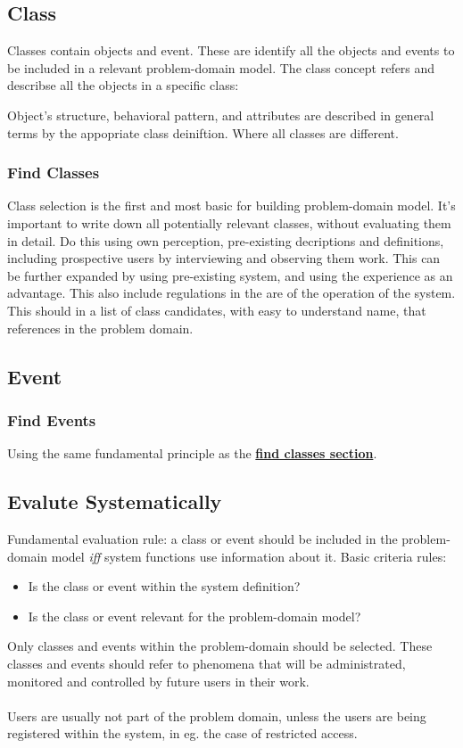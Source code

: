 \subsection*{Class}
Classes contain objects and event. These are identify all the objects and events to be included in a relevant problem-domain model.
The class concept refers and describse all the objects in a specific class:

Object's structure, behavioral pattern, and attributes are described in general terms by the appopriate class deiniftion. Where all classes are different.

\subsubsection*{Find Classes \ooad[57]}\label{sec:find_classes}
Class selection is the first and most basic for building problem-domain model. It's important to write down all potentially relevant classes, without evaluating them in detail. Do this using own perception, pre-existing decriptions and definitions, including prospective users by interviewing and observing them work. This can be further expanded by using pre-existing system, and using the experience as an advantage. This also include regulations in the are of the operation of the system. This should in a list of class candidates, with easy to understand name, that references in the problem domain.

\subsection*{Event}
\subsubsection*{Find Events \ooad[59]}
Using the same fundamental principle as the \textbf{\hyperref[sec:find_classes]{find classes section}}. 

\subsection*{Evalute Systematically \ooad[62]}
Fundamental evaluation rule: a class or event should be included in the problem-domain model \textit{iff} system functions use information about it. Basic criteria rules:
\begin{itemize}
    \item Is the class or event within the system definition?
    \item Is the class or event relevant for the problem-domain model?
\end{itemize}
Only classes and events within the problem-domain should be selected. These classes and events should refer to phenomena that will be administrated, monitored and controlled by future users in their work. \\\\
Users are usually not part of the problem domain, unless the users are being registered within the system, in eg. the case of restricted access.

